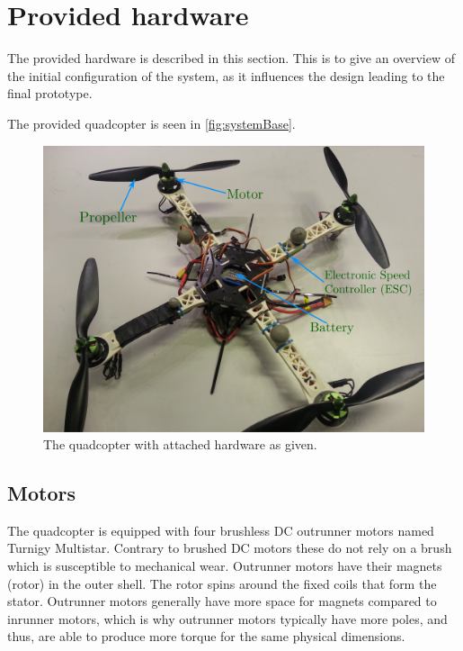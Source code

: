 \section{Provided hardware}\label{sec:hardware}
The provided hardware is described in this section. This is to give an overview of the initial configuration of the system, as it influences the design leading to the final prototype.


The provided quadcopter is seen in \autoref{fig:systemBase}.
\begin{figure}[H]
  \centering
  \includegraphics[width=.6\linewidth]{figures/quadcopterBaseLabels}
  \caption{The quadcopter with attached hardware as given.}
  \label{fig:systemBase}
\end{figure}

\subsection{Motors}
The quadcopter is equipped with four brushless DC outrunner motors named Turnigy Multistar. Contrary to brushed DC motors these do not rely on a brush which is susceptible to mechanical wear. Outrunner motors have their magnets (rotor) in the outer shell. The rotor spins around the fixed coils that form the stator. Outrunner motors generally have more space for magnets compared to inrunner motors, which is why outrunner motors typically have more poles, and thus, are able to produce more torque for the same physical dimensions. 

